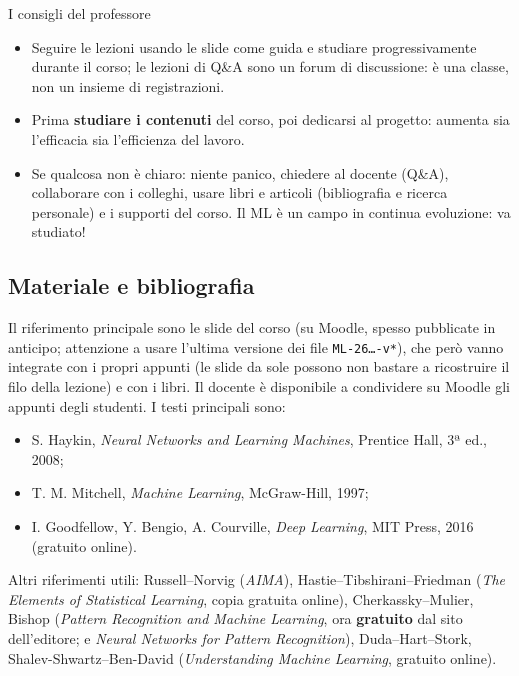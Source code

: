 \begin{boxtip}{I consigli del professore}

\begin{itemize}
\tightlist
\item
  Seguire le lezioni usando le slide come guida e studiare
  progressivamente durante il corso; le lezioni di Q\&A sono un forum di
  discussione: è una classe, non un insieme di registrazioni.
\item
  Prima \textbf{studiare i contenuti} del corso, poi dedicarsi al
  progetto: aumenta sia l'efficacia sia l'efficienza del lavoro.
\item
  Se qualcosa non è chiaro: niente panico, chiedere al docente (Q\&A),
  collaborare con i colleghi, usare libri e articoli (bibliografia e
  ricerca personale) e i supporti del corso. Il ML è un campo in
  continua evoluzione: va studiato!
\end{itemize}

\end{boxtip}

\subsection{Materiale e bibliografia}\label{materiale-e-bibliografia}

Il riferimento principale sono le slide del corso (su Moodle, spesso
pubblicate in anticipo; attenzione a usare l'ultima versione dei file
\texttt{ML-26…-v*}), che però vanno integrate con i propri appunti (le
slide da sole possono non bastare a ricostruire il filo della lezione) e
con i libri. Il docente è disponibile a condividere su Moodle gli
appunti degli studenti. I testi principali sono:

\begin{itemize}
\tightlist
\item
  S. Haykin, \emph{Neural Networks and Learning Machines}, Prentice
  Hall, 3ª ed., 2008;
\item
  T. M. Mitchell, \emph{Machine Learning}, McGraw-Hill, 1997;
\item
  I. Goodfellow, Y. Bengio, A. Courville, \emph{Deep Learning}, MIT
  Press, 2016 (gratuito online).
\end{itemize}

Altri riferimenti utili: Russell--Norvig (\emph{AIMA}),
Hastie--Tibshirani--Friedman (\emph{The Elements of Statistical
Learning}, copia gratuita online), Cherkassky--Mulier, Bishop
(\emph{Pattern Recognition and Machine Learning}, ora \textbf{gratuito}
dal sito dell'editore; e \emph{Neural Networks for Pattern
Recognition}), Duda--Hart--Stork, Shalev-Shwartz--Ben-David
(\emph{Understanding Machine Learning}, gratuito online).

